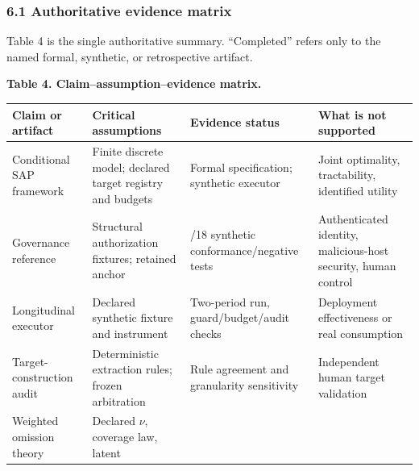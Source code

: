 \documentclass[
  11pt]{article}
\begin{document}
\subsubsection{6.1 Authoritative evidence
matrix}\label{authoritative-evidence-matrix}

Table 4 is the single authoritative summary. ``Completed'' refers only
to the named formal, synthetic, or retrospective artifact.

\textbf{Table 4. Claim--assumption--evidence matrix.}

\begin{longtable}[]{@{}
  >{\raggedright\arraybackslash}p{}
  >{\raggedright\arraybackslash}p{}
  >{\raggedright\arraybackslash}p{}
  >{\raggedright\arraybackslash}p{}@{}}
\toprule\noalign{}
\begin{minipage}[b]{\linewidth}\raggedright
Claim or artifact
\end{minipage} & \begin{minipage}[b]{\linewidth}\raggedright
Critical assumptions
\end{minipage} & \begin{minipage}[b]{\linewidth}\raggedright
Evidence status
\end{minipage} & \begin{minipage}[b]{\linewidth}\raggedright
What is not supported
\end{minipage} \\
\midrule\noalign{}
\endhead
\bottomrule\noalign{}
\endlastfoot
Conditional SAP framework & Finite discrete model; declared target
registry and budgets & Formal specification; synthetic executor & Joint
optimality, tractability, identified utility \\
Governance reference & Structural authorization fixtures; retained
anchor & 18/18 synthetic conformance/negative tests & Authenticated
identity, malicious-host security, human control \\
Longitudinal executor & Declared synthetic fixture and instrument &
Two-period run, guard/budget/audit checks & Deployment effectiveness or
real consumption \\
Target-construction audit & Deterministic extraction rules; frozen
arbitration & Rule agreement and granularity sensitivity & Independent
human target validation \\
Weighted omission theory & Declared \(\nu\), coverage law, latent

\end{longtable}
\end{document}
